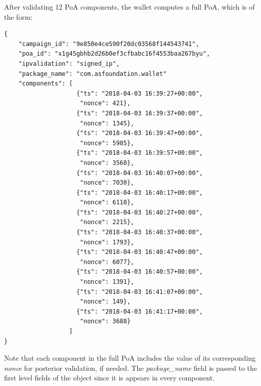 After validating 12 \textsf{PoA} components, the wallet computes a full \textsf{PoA}, which is of the form:
\begin{tcolorbox}[enhanced jigsaw,sharp corners, drop fuzzy shadow=ShadowColor]
\begin{lstlisting}[xleftmargin=0.05\textwidth]
{
    "campaign_id": "9e850e4ce590f20dc03568f144543741",
    "poa_id": "x1g45gbhb2d26b0ef3cfbabc16f4553baa267byu",
    "ipvalidation": "signed_ip",
    "package_name": "com.asfoundation.wallet"
    "components": [
                    {"ts": "2018-04-03 16:39:27+00:00",
                     "nonce": 421},
                    {"ts": "2018-04-03 16:39:37+00:00",
                     "nonce": 1345},
                    {"ts": "2018-04-03 16:39:47+00:00",
                     "nonce": 5985},
                    {"ts": "2018-04-03 16:39:57+00:00",
                     "nonce": 3568},
                    {"ts": "2018-04-03 16:40:07+00:00",
                     "nonce": 7030},
                    {"ts": "2018-04-03 16:40:17+00:00",
                     "nonce": 6110},
                    {"ts": "2018-04-03 16:40:27+00:00",
                     "nonce": 2215},
                    {"ts": "2018-04-03 16:40:37+00:00",
                     "nonce": 1793},
                    {"ts": "2018-04-03 16:40:47+00:00",
                     "nonce": 6077},
                    {"ts": "2018-04-03 16:40:57+00:00",
                     "nonce": 1391},
                    {"ts": "2018-04-03 16:41:07+00:00",
                     "nonce": 149},
                    {"ts": "2018-04-03 16:41:17+00:00",
                     "nonce": 3688}
                  ]
}
\end{lstlisting}
\end{tcolorbox}
Note that each component in the full \textsf{PoA} includes the value of its corresponding \textit{nonce} for posterior validation, if needed. The \textit{package\_name} field is passed to the first level fields of the object since it is appears in every component. \\

